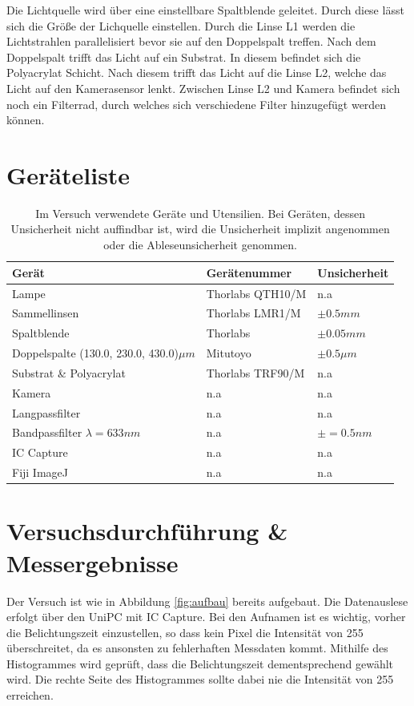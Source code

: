 \documentclass[12pt,a4paper,twoside]{article}
\begin{document}
\noindent
Die Lichtquelle wird über eine einstellbare Spaltblende geleitet. Durch diese lässt sich die Größe der Lichquelle einstellen. 
Durch die Linse L1 werden die Lichtstrahlen parallelisiert bevor sie auf den Doppelspalt treffen. 
Nach dem Doppelspalt trifft das Licht auf ein Substrat. In diesem befindet sich die Polyacrylat Schicht. 
Nach diesem trifft das Licht auf die Linse L2, welche das Licht auf den Kamerasensor lenkt. Zwischen Linse L2 und Kamera befindet sich noch ein Filterrad, durch welches sich verschiedene Filter hinzugefügt werden können. 


\section{Geräteliste} %

    \begin{table}[H]
        \centering
        \caption{Im Versuch verwendete Geräte und Utensilien. Bei Geräten, dessen Unsicherheit nicht auffindbar ist, wird die Unsicherheit implizit angenommen oder die Ableseunsicherheit genommen. }
        \label{tab:geraete}
        \begin{tabular}{| l | l | l |}
            \hline
            Gerät    & Gerätenummer  & Unsicherheit \\
            \hline
            Lampe & Thorlabs QTH10/M & {n.a} \\
            Sammellinsen & Thorlabs LMR1/M & $\pm 0.5 mm$ \\
            Spaltblende & Thorlabs & $\pm 0.05 mm$ \\
            Doppelspalte (130.0, 230.0, 430.0)$\mu m$ & Mitutoyo & $\pm 0.5 \mu m$ \\
            Substrat \& Polyacrylat & Thorlabs TRF90/M & {n.a} \\
            Kamera & {n.a} & {n.a} \\
            Langpassfilter  & {n.a} & {n.a} \\
            Bandpassfilter $\lambda = 633 nm$& {n.a} & $\pm = 0.5 nm$ \\
            IC Capture & {n.a} & {n.a} \\
            Fiji ImageJ & {n.a} & {n.a} \\
            \hline
        \end{tabular}
    \end{table}


\section{Versuchsdurchführung \& Messergebnisse} %
Der Versuch ist wie in Abbildung \ref{fig:aufbau} bereits aufgebaut. Die Datenauslese erfolgt über den UniPC mit IC Capture. 
Bei den Aufnamen ist es wichtig, vorher die Belichtungszeit einzustellen, so dass kein Pixel die Intensität von 255 überschreitet, da es ansonsten zu fehlerhaften Messdaten kommt. 
Mithilfe des Histogrammes wird geprüft, dass die Belichtungszeit dementsprechend gewählt wird. Die rechte Seite des Histogrammes sollte dabei nie die Intensität von 255 erreichen. 
\end{document}
